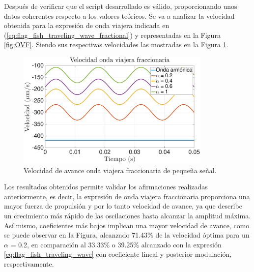 Después de verificar que el script desarrollado es válido, proporcionando unos datos coherentes respecto a los valores teóricos. Se va a analizar la velocidad obtenida para la expresión de onda viajera indicada en (\ref{eq:flag_fish_traveling_wave_fractional}) y representadas en la Figura \ref{fig:OVF}. Siendo sus respectivas velocidades las mostradas en la Figura \ref{fig:VCF}. 
\begin{figure}[!h] %
	\vspace*{3mm}
    \centering
    \includegraphics[width=0.85\textwidth]{Figuras/VCF}
  	\caption{Velocidad de avance onda viajera fraccionaria de pequeña señal.}
  	\label{fig:VCF}
\end{figure}

Los resultados obtenidos permite validar los afirmaciones realizadas anteriormente, es decir, la expresión de onda viajera fraccionaria proporciona una mayor fuerza de propulsión y por lo tanto velocidad de avance, ya que describe un crecimiento más rápido de las oscilaciones hasta alcanzar la amplitud máxima. Así mismo, coeficientes más bajos implican una mayor velocidad de avance, como se puede observar en la Figura, alcanzado 71.43\% de la velocidad óptima para un $\alpha$ = 0.2, en comparación al 33.33\% o 39.25\% alcanzado con la expresión \ref{eq:flag_fish_traveling_wave} con coeficiente lineal y posterior modulación, respectivamente.



















